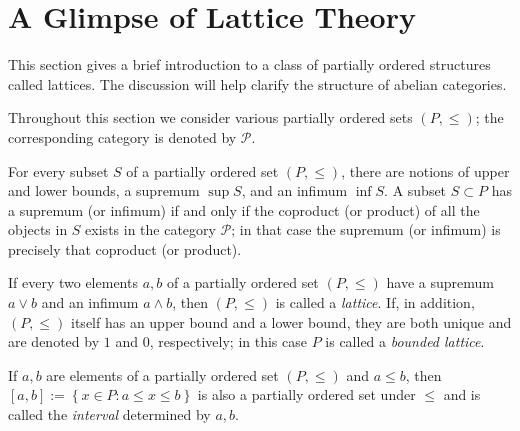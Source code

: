 
\section{A Glimpse of Lattice Theory}\label{sec:lattices}
\hypertarget{o014.aljabr2.chapter2.glimpse-of-lattice-theory}{ }

This section gives a brief introduction to a class of partially ordered
structures called lattices. The discussion will help clarify the structure of
abelian categories.

Throughout this section we consider various partially ordered sets $(P,\leq)$;
the corresponding category is denoted by $\mathcal{P}$.

For every subset $S$ of a partially ordered set $(P,\leq)$, there are notions
of upper and lower bounds, a supremum $\sup S$, and an infimum $\inf S$. A
subset $S\subset P$ has a supremum (or infimum) if and only if the coproduct
(or product) of all the objects in $S$ exists in the category $\mathcal{P}$;
in that case the supremum (or infimum) is precisely that coproduct (or
product).

\begin{definition}\label{def:lattice-order}
	If every two elements $a,b$ of a partially ordered set $(P,\leq)$ have a
	supremum $a\vee b$ and an infimum $a\wedge b$, then $(P,\leq)$ is called a
	\emph{lattice}. If, in addition, $(P,\leq)$ itself has an upper bound and a
	lower bound, they are both unique and are denoted by $1$ and $0$,
	respectively; in this case $P$ is called a \emph{bounded lattice}.

	If $a,b$ are elements of a partially ordered set $(P,\leq)$ and $a\leq b$,
	then $[a,b]:=\left\{x\in P:a\leq x\leq b\right\}$ is also a partially
	ordered set under $\leq$ and is called the \emph{interval} determined by
	$a,b$.
\end{definition}

